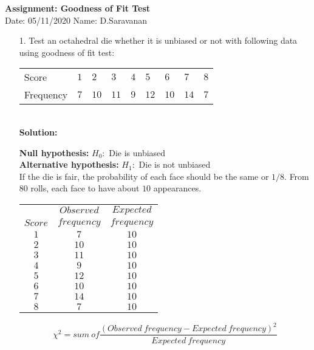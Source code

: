 \documentclass[a4paper,11pt,openright]{report}
\begin{document}
\singlespacing
\pagestyle{plain}

\begin{center}
\textbf{Assignment: Goodness of Fit Test} \\
Date: 05/11/2020 \hspace{2mm} Name: D.Saravanan
\end{center}

\vspace{10px}

\begin{enumerate}

\item[1.] Test an octahedral die whether it is unbiased or not with following data using
goodness of fit test:

\begin{tabular}{lllllllll}
Score & $1$ & $2$ & $3$ & $4$ & $5$ & $6$ & $7$ & $8$ \\
Frequency & $7$ & $10$ & $11$ & $9$ & $12$ & $10$ & $14$ & $7$ \\
\end{tabular} \\

\textbf{Solution:}

\textbf{Null hypothesis:} $H_{0}:$ Die is unbiased \\
\textbf{Alternative hypothesis:} $H_{1}:$ Die is not unbiased \\

If the die is fair, the probability of each face should be the same or $1/8$. From $80$ rolls, each
face to have about $10$ appearances.

\begin{center}
\begin{tabular}{ccc}
& $Observed$ & $Expected$ \\
$Score$ & $frequency$ & $frequency$ \\
\hline
$1$ & $7$ & $10$ \\
$2$ & $10$ & $10$ \\
$3$ & $11$ & $10$ \\
$4$ & $9$ & $10$ \\
$5$ & $12$ & $10$ \\
$6$ & $10$ & $10$ \\
$7$ & $14$ & $10$ \\
$8$ & $7$ & $10$ \\
\end{tabular}
\end{center}

\begin{equation*}
\chi^2 = sum \: of \frac{(Observed \: frequency - Expected \: frequency)^2}{Expected \: frequency}
\end{equation*}


\end{enumerate}
\end{document}
